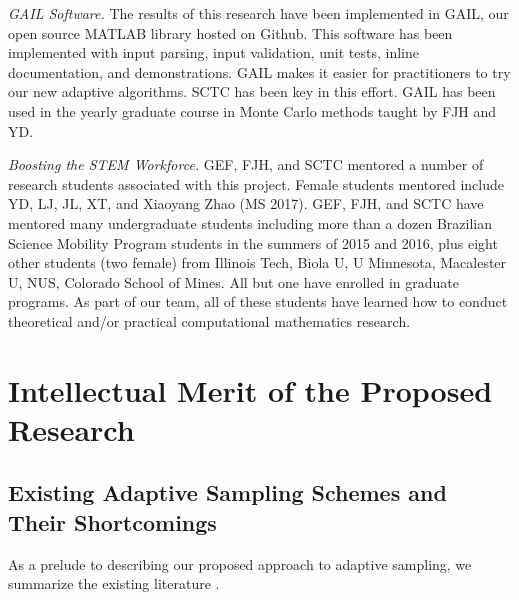 \documentclass[11pt]{NSFamsart}
\newcommand{\GAIL}{GAIL\xspace}
\newcommand{\MATLAB}{MATLAB\xspace}
\newcommand{\Rlang}{R\xspace}
\begin{document}
\emph{\GAIL Software.} The results of this research have been implemented in 
\GAIL, our open source \MATLAB library hosted on
Github. This software 
has been implemented with input parsing, input validation, unit tests, inline documentation, and 
demonstrations.  \GAIL makes it easier for practitioners to try our new adaptive algorithms.  SCTC has been key in this effort.  \GAIL has been used in the yearly graduate course in Monte Carlo methods taught by FJH and YD.  

\emph{Boosting the STEM Workforce.} GEF, FJH, and SCTC mentored a number of 
research students associated with this project.  Female students mentored include YD, LJ, JL, XT, and Xiaoyang Zhao (MS 2017).   GEF, FJH,  and SCTC have mentored many undergraduate students including more than a dozen 
Brazilian Science Mobility Program students in the summers of 2015 and 2016, plus eight other students (two female) from Illinois Tech, Biola U, U Minnesota, Macalester U, NUS, Colorado School of Mines.  All but one have enrolled in graduate programs.   As part of our team, all of
these students have learned how to conduct theoretical and/or practical computational mathematics research.

\section{Intellectual Merit of the Proposed Research} \label{sec:Proposed}

\subsection{Existing Adaptive Sampling Schemes and Their Shortcomings} \label{sec:shortExist}

As a prelude to describing our proposed approach to adaptive sampling, we summarize the existing literature \cite{aute2013cross,burnaev2015adaptive,fu2017adaptive,gramacy2008adaptive,jin2002sequential,kleijnen2004application}.

\end{document}
